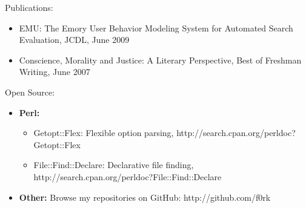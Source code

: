 \documentclass[10pt,oneside]{article}
\newenvironment{ressection}[1]{
	\vspace{1pt}
	{\fontfamily{phv}\selectfont\Large#1}
	\begin{itemize}
	\vspace{1pt}
}{
	\end{itemize}
}
\newcommand{\resitem}[1]{
	\vspace{-4pt}
	\item \begin{flushleft} #1 \end{flushleft}
}
\newcommand{\ressubitem}[1]{
	\vspace{-2pt}
	\item \begin{flushleft} #1 \end{flushleft}
}
\newenvironment{reslist}[1]{
	\resitem{\textbf{#1}}
	\vspace{-5pt}
	\begin{itemize}
}{
	\end{itemize}
}
\begin{document}
\begin{ressection}{Publications:}

    \resitem{EMU: The Emory User Behavior Modeling System for Automated Search Evaluation, JCDL, June 2009}
    \resitem{Conscience, Morality and Justice: A Literary Perspective, Best of Freshman Writing, June 2007}
	
\end{ressection}

\begin{ressection}{Open Source:}

	\begin{reslist}{Perl:}
		\ressubitem{Getopt::Flex: Flexible option parsing, http://search.cpan.org/perldoc?Getopt::Flex}
		\ressubitem{File::Find::Declare: Declarative file finding, http://search.cpan.org/perldoc?File::Find::Declare}
	\end{reslist}

    \resitem{\textbf{Other:} Browse my repositories on GitHub: http://github.com/f0rk}

\end{ressection}
\end{document}

